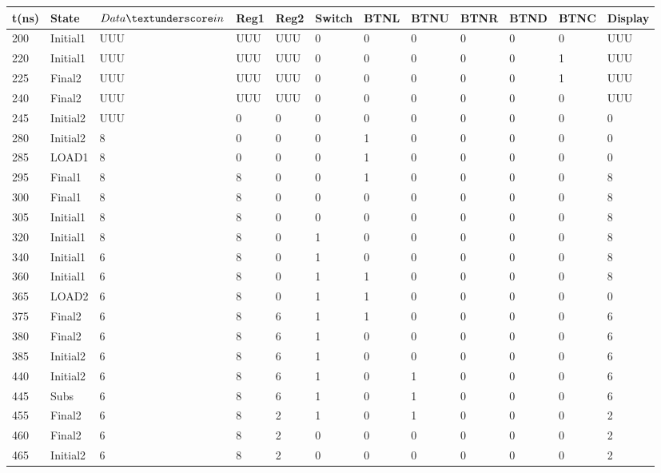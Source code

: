 \documentclass[12pt]{article}
\begin{document}
\begin{table}[H]
   
    \hskip-1.0cm\begin{tabular}{|l|l|l|l|l|l|l|l|l|l|l|l|}
    \hline
        t(ns) & State & $Data\textunderscore in$  & Reg1 & Reg2 & Switch & BTNL & BTNU & BTNR & BTND& BTNC& Display\\
        \hline
        200 & Initial1 & UUU & UUU&UUU&0&0&0&0&0&0&UUU\\
        \hline
         220 & Initial1 & UUU & UUU&UUU&0&0&0&0&0&1&UUU\\
        \hline
         225 & Final2 & UUU & UUU&UUU&0&0&0&0&0&1&UUU\\
        \hline
        240 & Final2 & UUU & UUU&UUU&0&0&0&0&0&0&UUU\\
        \hline
        245 & Initial2 & UUU & 0&0&0&0&0&0&0&0&0\\
        \hline
        280 & Initial2 & 8 & 0&0&0&1&0&0&0&0&0\\
        \hline
        285 & LOAD1 & 8 & 0&0&0&1&0&0&0&0&0\\
        \hline
        295 & Final1 & 8 & 8&0&0&1&0&0&0&0&8\\
        \hline
        300 & Final1 & 8 & 8&0&0&0&0&0&0&0&8\\
        \hline
        305 & Initial1 & 8 & 8&0&0&0&0&0&0&0&8\\
        \hline
        320 & Initial1 & 8 & 8&0&1&0&0&0&0&0&8\\
        \hline
        340 & Initial1 & 6 & 8&0&1&0&0&0&0&0&8\\
        \hline
        360 & Initial1 & 6 & 8&0&1&1&0&0&0&0&8\\
        \hline
        365 & LOAD2 & 6 & 8&0&1&1&0&0&0&0&0\\
        \hline
        375 & Final2 & 6 & 8&6&1&1&0&0&0&0&6\\
        \hline
        380 & Final2 & 6 & 8&6&1&0&0&0&0&0&6\\
        \hline
        385 & Initial2 & 6 & 8&6&1&0&0&0&0&0&6\\
        \hline
        440 & Initial2 & 6 & 8&6&1&0&1&0&0&0&6\\
        \hline
        445 & Subs & 6 & 8&6&1&0&1&0&0&0&6\\
        \hline
        455 & Final2 & 6 & 8&2&1&0&1&0&0&0&2\\
        \hline
        460 & Final2 & 6 & 8&2&0&0&0&0&0&0&2\\
        \hline
        465 & Initial2 & 6 & 8&2&0&0&0&0&0&0&2\\

\end{tabular}
\end{table}
\end{document}
